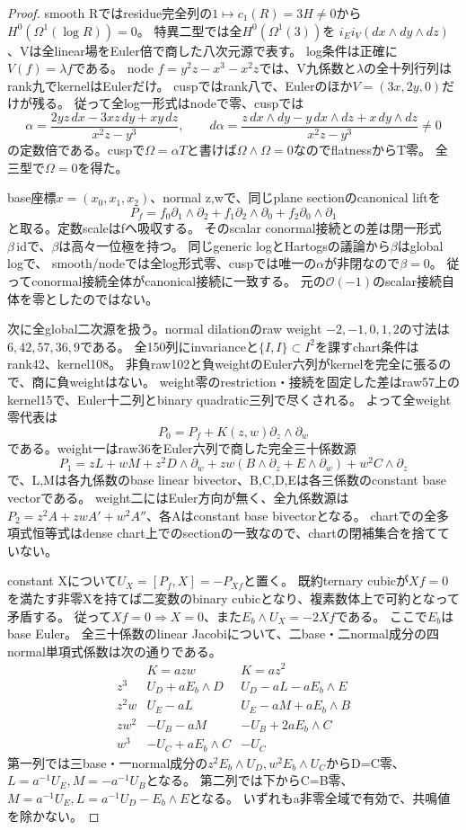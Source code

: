 \documentclass[a4paper,11pt]{ltjsarticle}
\theoremstyle{definition}
\begin{document}
\begin{proof}
smooth Rではresidue完全列の$1\mapsto c_1(R)=3H\ne0$から$H^0(\Omega^1(\log R))=0$。
特異二型では全$H^0(\Omega^1(3))$を
$i_Ei_V(dx\wedge dy\wedge dz)$、Vは全linear場をEuler倍で商した八次元源で表す。
log条件は正確に$V(f)=\lambda f$である。
node $f=y^2z-x^3-x^2z$では、V九係数と$\lambda$の全十列行列はrank九でkernelはEulerだけ。
cuspではrank八で、Eulerのほか$V=(3x,2y,0)$だけが残る。
従って全log一形式はnodeで零、cuspでは
\[
 \alpha=\frac{2yz\,dx-3xz\,dy+xy\,dz}{x^2z-y^3},\qquad
 d\alpha=\frac{z\,dx\wedge dy-y\,dx\wedge dz+x\,dy\wedge dz}{x^2z-y^3}\ne0
\]
の定数倍である。cuspで$\Omega=\alpha T$と書けば$\Omega\wedge\Omega=0$なのでflatnessからT零。
全三型で$\Omega=0$を得た。

base座標$x=(x_0,x_1,x_2)$、normal z,wで、同じplane sectionのcanonical liftを
\[
 P_f=f_0\partial_1\wedge\partial_2+f_1\partial_2\wedge\partial_0+f_2\partial_0\wedge\partial_1
\]
と取る。定数scaleはfへ吸収する。
そのscalar conormal接続との差は閉一形式$\beta\,\mathrm{id}$で、$\beta$は高々一位極を持つ。
同じgeneric logとHartogsの議論から$\beta$はglobal logで、
smooth/nodeでは全log形式零、cuspでは唯一の$\alpha$が非閉なので$\beta=0$。
従ってconormal接続全体がcanonical接続に一致する。
元の$\mathcal O(-1)$のscalar接続自体を零としたのではない。

次に全global二次源を扱う。normal dilationのraw weight $-2,-1,0,1,2$の寸法は
$6,42,57,36,9$である。
全150列にinvarianceと$\{I,I\}\subset I^2$を課すchart条件はrank42、kernel108。
非負raw102と負weightのEuler六列がkernelを完全に張るので、商に負weightはない。
weight零のrestriction・接続を固定した差はraw57上のkernel15で、Euler十二列とbinary quadratic三列で尽くされる。
よって全weight零代表は
\[
 P_0=P_f+K(z,w)\partial_z\wedge\partial_w
\]
である。weight一はraw36をEuler六列で商した完全三十係数源
\[
 P_1=zL+wM+z^2D\wedge\partial_w
       +zw(B\wedge\partial_z+E\wedge\partial_w)+w^2C\wedge\partial_z
\]
で、L,Mは各九係数のbase linear bivector、B,C,D,Eは各三係数のconstant base vectorである。
weight二にはEuler方向が無く、全九係数源は$P_2=z^2A+zwA'+w^2A''$、各Aはconstant base bivectorとなる。
chartでの全多項式恒等式はdense chart上でのsectionの一致なので、chartの閉補集合を捨てていない。

constant Xについて$U_X=[P_f,X]=-P_{Xf}$と置く。
既約ternary cubicが$Xf=0$を満たす非零Xを持てば二変数のbinary cubicとなり、複素数体上で可約となって矛盾する。
従って$Xf=0\Rightarrow X=0$、また$E_b\wedge U_X=-2Xf$である。
ここで$E_b$はbase Euler。
全三十係数のlinear Jacobiについて、二base・二normal成分の四normal単項式係数は次の通りである。
\[
\begin{array}{c|c|c}
 &K=azw&K=az^2\\\hline
 z^3&U_D+aE_b\wedge D&U_D-aL-aE_b\wedge E\\
 z^2w&U_E-aL&U_E-aM+aE_b\wedge B\\
 zw^2&-U_B-aM&-U_B+2aE_b\wedge C\\
 w^3&-U_C+aE_b\wedge C&-U_C
\end{array}
\]
第一列では三base・一normal成分の$z^2E_b\wedge U_D,w^2E_b\wedge U_C$からD=C零、
$L=a^{-1}U_E,M=-a^{-1}U_B$となる。
第二列では下からC=B零、$M=a^{-1}U_E,L=a^{-1}U_D-E_b\wedge E$となる。
いずれもa非零全域で有効で、共鳴値を除かない。


\end{proof}
\end{document}
